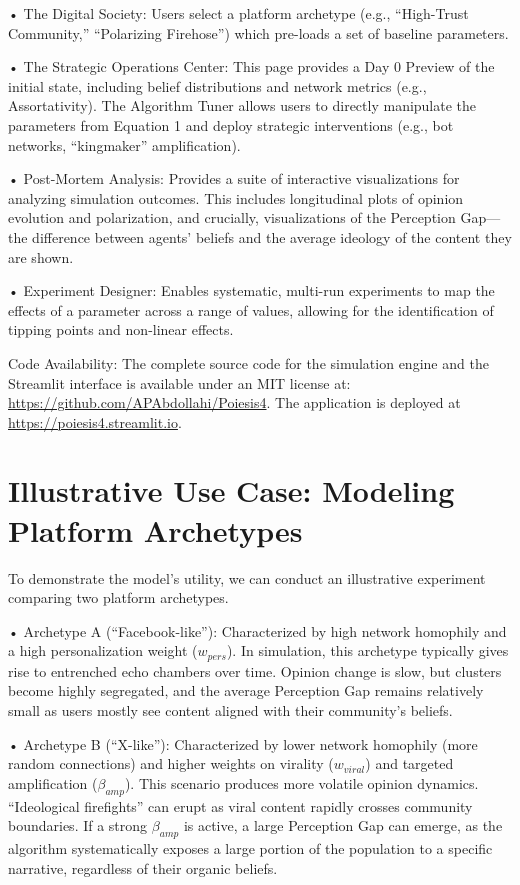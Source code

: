 \documentclass[11pt]{article}
\begin{document}
• The Digital Society: Users select a platform archetype (e.g., ``High-Trust Community,'' ``Polarizing Firehose'') which pre-loads a set of baseline parameters.

• The Strategic Operations Center: This page provides a Day 0 Preview of the initial state, including belief distributions and network metrics (e.g., Assortativity). The Algorithm Tuner allows users to directly manipulate the parameters from Equation 1 and deploy strategic interventions (e.g., bot networks, ``kingmaker'' amplification).

• Post-Mortem Analysis: Provides a suite of interactive visualizations for analyzing simulation outcomes. This includes longitudinal plots of opinion evolution and polarization, and crucially, visualizations of the Perception Gap—the difference between agents’ beliefs and the average ideology of the content they are shown.

• Experiment Designer: Enables systematic, multi-run experiments to map the effects of a parameter across a range of values, allowing for the identification of tipping points and non-linear effects.

Code Availability: The complete source code for the simulation engine and the Streamlit interface is available under an MIT license at: \url{https://github.com/APAbdollahi/Poiesis4}. The application is deployed at \url{https://poiesis4.streamlit.io}.

\section{Illustrative Use Case: Modeling Platform Archetypes}

To demonstrate the model’s utility, we can conduct an illustrative experiment comparing two platform archetypes.

• Archetype A (``Facebook-like''): Characterized by high network homophily and a high personalization weight ($w_{pers}$). In simulation, this archetype typically gives rise to entrenched echo chambers over time. Opinion change is slow, but clusters become highly segregated, and the average Perception Gap remains relatively small as users mostly see content aligned with their community’s beliefs.

• Archetype B (``X-like''): Characterized by lower network homophily (more random connections) and higher weights on virality ($w_{viral}$) and targeted amplification ($\beta_{amp}$). This scenario produces more volatile opinion dynamics. ``Ideological firefights'' can erupt as viral content rapidly crosses community boundaries. If a strong $\beta_{amp}$ is active, a large Perception Gap can emerge, as the algorithm systematically exposes a large portion of the population to a specific narrative, regardless of their organic beliefs.
\end{document}
